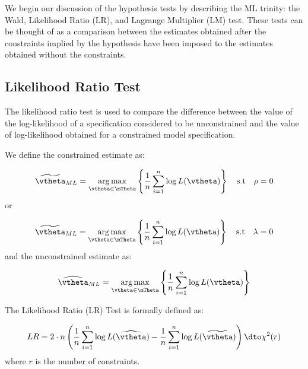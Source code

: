 \documentclass[english,12pt]{book}\usepackage[]{graphicx}\usepackage[]{xcolor}
\begin{document}
We begin our discussion of the hypothesis tests by describing the ML trinity: the Wald, Likelihood Ratio (LR), and Lagrange Multiplier (LM) test. These tests can be thought of as a comparison between the estimates obtained after the constraints implied by the hypothesis have been imposed to the estimates obtained without the constraints.




%



\subsection{Likelihood Ratio Test}

The likelihood ratio test is used to compare the difference between the value of the log-likelihood of a specification considered to be unconstrained and the value of log-likelihood obtained for a constrained model specification.

We define the constrained estimate as:

\begin{equation}
\widetilde{\vtheta}_{ML}  = \underset{\vtheta\in\mTheta}{\arg\max}\left\lbrace \frac{1}{n}\sum_{i = 1}^n\log L(\vtheta) \right\rbrace\quad\mbox{s.t}\quad \rho = 0
\end{equation}
%
or 

\begin{equation}
\widetilde{\vtheta}_{ML}  = \underset{\vtheta\in\mTheta}{\arg\max}\left\lbrace \frac{1}{n}\sum_{i = 1}^n\log L(\vtheta) \right\rbrace\quad\mbox{s.t}\quad \lambda = 0
\end{equation}
%
and the unconstrained estimate as:

\begin{equation}
\widehat{\vtheta}_{ML}  = \underset{\vtheta\in\mTheta}{\arg\max}\left\lbrace \frac{1}{n}\sum_{i = 1}^n\log L(\vtheta) \right\rbrace
\end{equation}

\begin{definition}
The Likelihood Ratio (LR) Test is formally defined as:

\begin{equation}\label{eq:def_LR}
LR = 2\cdot n\left(\frac{1}{n}\sum_{i = 1}^n\log L(\widehat{\vtheta})-\frac{1}{n}\sum_{i = 1}^n\log L(\widetilde{\vtheta})\right)\dto \chi^2(r)
\end{equation}
%
where $r$ is the number of constraints.
\end{definition}
\end{document}
